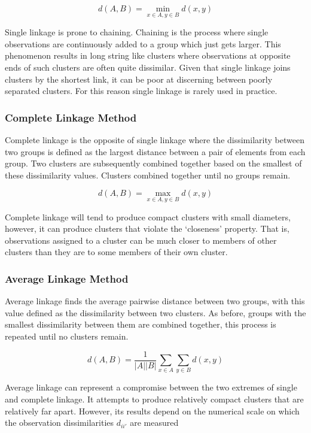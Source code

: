 \documentclass[]{article}
\begin{document}
\begin{equation}
	d(A, B) = \min_{x \in A, y \in B} d(x,y)
\end{equation}

\noindent Single linkage is prone to chaining. Chaining is the process where single observations are continuously added to a group which just gets larger. This phenomenon results in long string like clusters where observations at opposite ends of such clusters are often quite dissimilar. Given that single linkage joins clusters by the shortest link, it can be poor at discerning between poorly separated clusters. For this reason single linkage is rarely used in practice. 

\subsubsection{Complete Linkage Method}
Complete linkage is the opposite of single linkage where the dissimilarity between two groups is defined as the largest distance between a pair of elements from each group. Two clusters are subsequently combined together based on the smallest of these dissimilarity values. Clusters combined together until no groups remain.

\begin{equation}
	d(A, B) = \max_{x \in A, y \in B} d(x,y)
\end{equation}

\noindent Complete linkage will tend to produce compact clusters with small diameters, however, it can produce clusters that violate the `closeness' property. That is, observations assigned to a cluster can be much closer to members of other clusters than they are to some members of their own cluster.

\subsubsection{Average Linkage Method}
Average linkage finds the average pairwise distance between two groups, with this value defined as the dissimilarity between two clusters. As before, groups with the smallest dissimilarity between them are combined together, this process is repeated until no clusters remain. 
 
\begin{equation}
	d(A, B) = \frac{1}{|A||B|}\sum_{x \in A} \sum_{y \in B} d(x,y)
\end{equation}

\noindent Average linkage can represent a compromise between the two extremes of single and complete linkage. It attempts to produce relatively compact clusters that are relatively far apart. However, its results depend on the numerical scale on which the observation dissimilarities $d_{ii'}$ are measured
\end{document}
